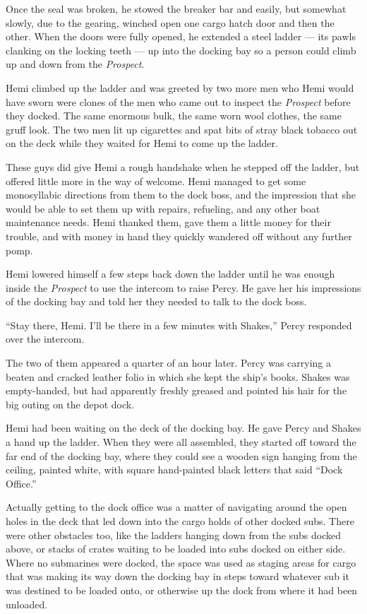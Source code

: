 \documentclass[
]{scrbook}
\begin{document}
Once the seal was broken, he stowed the breaker bar and easily, but
somewhat slowly, due to the gearing, winched open one cargo hatch door
and then the other. When the doors were fully opened, he extended a
steel ladder --- its pawls clanking on the locking teeth --- up into the
docking bay so a person could climb up and down from the
\emph{Prospect}.

Hemi climbed up the ladder and was greeted by two more men who Hemi
would have sworn were clones of the men who came out to inspect the
\emph{Prospect} before they docked. The same enormous bulk, the same
worn wool clothes, the same gruff look. The two men lit up cigarettes
and spat bits of stray black tobacco out on the deck while they waited
for Hemi to come up the ladder.

These guys did give Hemi a rough handshake when he stepped off the
ladder, but offered little more in the way of welcome. Hemi managed to
get some monosyllabic directions from them to the dock boss, and the
impression that she would be able to set them up with repairs,
refueling, and any other boat maintenance needs. Hemi thanked them, gave
them a little money for their trouble, and with money in hand they
quickly wandered off without any further pomp.

Hemi lowered himself a few steps back down the ladder until he was
enough inside the \emph{Prospect} to use the intercom to raise Percy. He
gave her his impressions of the docking bay and told her they needed to
talk to the dock boss.

``Stay there, Hemi. I'll be there in a few minutes with Shakes,'' Percy
responded over the intercom.

\bigskip

The two of them appeared a quarter of an hour later. Percy was carrying
a beaten and cracked leather folio in which she kept the ship's books.
Shakes was empty-handed, but had apparently freshly greased and pointed
his hair for the big outing on the depot dock.

Hemi had been waiting on the deck of the docking bay. He gave Percy and
Shakes a hand up the ladder. When they were all assembled, they started
off toward the far end of the docking bay, where they could see a wooden
sign hanging from the ceiling, painted white, with square hand-painted
black letters that said ``Dock Office.''

Actually getting to the dock office was a matter of navigating around
the open holes in the deck that led down into the cargo holds of other
docked subs. There were other obstacles too, like the ladders hanging
down from the subs docked above, or stacks of crates waiting to be
loaded into subs docked on either side. Where no submarines were docked,
the space was used as staging areas for cargo that was making its way
down the docking bay in steps toward whatever sub it was destined to be
loaded onto, or otherwise up the dock from where it had been unloaded.
\end{document}
